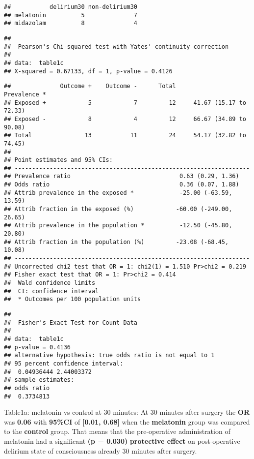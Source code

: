 \documentclass[
]{article}
\begin{document}
\begin{verbatim}
##           delirium30 non-delirium30
## melatonin          5              7
## midazolam          8              4
\end{verbatim}

\begin{verbatim}
## 
##  Pearson's Chi-squared test with Yates' continuity correction
## 
## data:  table1c
## X-squared = 0.67133, df = 1, p-value = 0.4126
\end{verbatim}

\begin{verbatim}
##              Outcome +    Outcome -      Total               Prevalence *
## Exposed +            5            7         12     41.67 (15.17 to 72.33)
## Exposed -            8            4         12     66.67 (34.89 to 90.08)
## Total               13           11         24     54.17 (32.82 to 74.45)
## 
## Point estimates and 95% CIs:
## -------------------------------------------------------------------
## Prevalence ratio                               0.63 (0.29, 1.36)
## Odds ratio                                     0.36 (0.07, 1.88)
## Attrib prevalence in the exposed *             -25.00 (-63.59, 13.59)
## Attrib fraction in the exposed (%)            -60.00 (-249.00, 26.65)
## Attrib prevalence in the population *          -12.50 (-45.80, 20.80)
## Attrib fraction in the population (%)         -23.08 (-68.45, 10.08)
## -------------------------------------------------------------------
## Uncorrected chi2 test that OR = 1: chi2(1) = 1.510 Pr>chi2 = 0.219
## Fisher exact test that OR = 1: Pr>chi2 = 0.414
##  Wald confidence limits
##  CI: confidence interval
##  * Outcomes per 100 population units
\end{verbatim}

\begin{verbatim}
## 
##  Fisher's Exact Test for Count Data
## 
## data:  table1c
## p-value = 0.4136
## alternative hypothesis: true odds ratio is not equal to 1
## 95 percent confidence interval:
##  0.04936444 2.44003372
## sample estimates:
## odds ratio 
##  0.3734813
\end{verbatim}

Table1a: melatonin vs control at 30 minutes: At 30 minutes after surgery
the \textbf{OR} was \textbf{0.06} with \textbf{95\%CI} of
\textbf{{[}0.01, 0.68{]}} when the \textbf{melatonin} group was compared
to the \textbf{control} group. That means that the pre-operative
administration of melatonin had a significant \textbf{(p = 0.030)}
\textbf{protective effect} on post-operative delirium state of
consciousness already 30 minutes after surgery.
\end{document}
